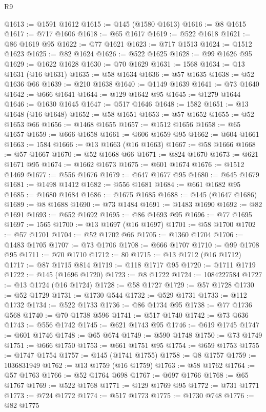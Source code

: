 \begin{lexlean}{R9}
\begin{coremodule}
@1613 := @1591 @1612
@1615 := @145 (@1580 @1613)
@1616 := @8 @1615
@1617 := @717 @1606
@1618 := @65 @1617
@1619 := @522 @1618
@1621 := @86 @1619 @95
@1622 := @77 @1621
@1623 := @717 @1513
@1624 := @1512 @1623
@1625 := @82 @1624
@1626 := @522 @1625
@1628 := @99 @1626 @95
@1629 := @1622 @1628
@1630 := @70 @1629
@1631 := 1568
@1634 := @13 @1631 (@16 @1631)
@1635 := @58 @1634
@1636 := @57 @1635
@1638 := @52 @1636 @66
@1639 := @210 @1638
@1640 := @1149 @1639
@1641 := @73 @1640
@1642 := @666 @1641
@1644 := @129 @1642 @95
@1645 := @1279 @1644
@1646 := @1630 @1645
@1647 := @517 @1646
@1648 := 1582
@1651 := @13 @1648 (@16 @1648)
@1652 := @58 @1651
@1653 := @57 @1652
@1655 := @52 @1653 @66
@1656 := @1468 @1655
@1657 := @1512 @1656
@1658 := @65 @1657
@1659 := @666 @1658
@1661 := @606 @1659 @95
@1662 := @604 @1661
@1663 := 1584
@1666 := @13 @1663 (@16 @1663)
@1667 := @58 @1666
@1668 := @57 @1667
@1670 := @52 @1668 @66
@1671 := @824 @1670
@1673 := @621 @1671 @95
@1674 := @1662 @1673
@1675 := @601 @1674
@1676 := @1512 @1469
@1677 := @556 @1676
@1679 := @647 @1677 @95
@1680 := @645 @1679
@1681 := @1498 @1412
@1682 := @556 @1681
@1684 := @661 @1682 @95
@1685 := @1680 @1684
@1686 := @1675 @1685
@1688 := @145 (@1647 @1686)
@1689 := @8 @1688
@1690 := @73 @1484
@1691 := @1483 @1690
@1692 := @82 @1691
@1693 := @652 @1692
@1695 := @86 @1693 @95
@1696 := @77 @1695
@1697 := 1565
@1700 := @13 @1697 (@16 @1697)
@1701 := @58 @1700
@1702 := @57 @1701
@1704 := @52 @1702 @66
@1705 := @1360 @1704
@1706 := @1483 @1705
@1707 := @73 @1706
@1708 := @666 @1707
@1710 := @99 @1708 @95
@1711 := @70 @1710
@1712 := 80
@1715 := @13 @1712 (@16 @1712)
@1717 := @87 @1715 @814
@1719 := @118 @1717 @95
@1720 := @1711 @1719
@1722 := @145 (@1696 @1720)
@1723 := @8 @1722
@1724 := 1084227584
@1727 := @13 @1724 (@16 @1724)
@1728 := @58 @1727
@1729 := @57 @1728
@1730 := @52 @1729
@1731 := @1730 @544
@1732 := @529 @1731
@1733 := @112 @1732
@1734 := @522 @1733
@1736 := @86 @1734 @95
@1738 := @77 @1736 @568
@1740 := @70 @1738 @596
@1741 := @517 @1740
@1742 := @73 @636
@1743 := @556 @1742
@1745 := @621 @1743 @95
@1746 := @619 @1745
@1747 := @601 @1746
@1748 := @65 @674
@1749 := @590 @1748
@1750 := @73 @1749
@1751 := @666 @1750
@1753 := @661 @1751 @95
@1754 := @659 @1753
@1755 := @1747 @1754
@1757 := @145 (@1741 @1755)
@1758 := @8 @1757
@1759 := 1036831949
@1762 := @13 @1759 (@16 @1759)
@1763 := @58 @1762
@1764 := @57 @1763
@1766 := @52 @1764 @698
@1767 := @697 @1766
@1768 := @65 @1767
@1769 := @522 @1768
@1771 := @129 @1769 @95
@1772 := @731 @1771
@1773 := @724 @1772
@1774 := @517 @1773
@1775 := @1730 @748
@1776 := @82 @1775

\end{coremodule}
\end{lexlean}
